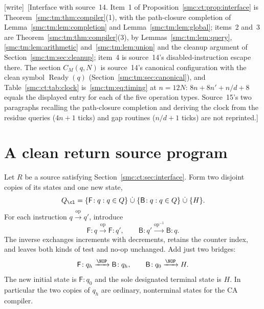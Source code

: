 \documentclass[11pt,letterpaper]{article}
\numberwithin{equation}{section}
\theoremstyle{definition}
\theoremstyle{remark}
\newcommand{\wtag}{\textup{[write]}}
\newcommand{\Ready}{\operatorname{Ready}}
\newcommand{\Fq}[1]{\mathsf F\!:#1}\newcommand{\Bq}[1]{\mathsf B\!:#1}
\begin{document}
\wtag\ [Interface with source~14. Item~1 of Proposition~\ref{smc:ct:prop:interface} is Theorem~\ref{smc:tm:thm:compiler}(1), with the path-closure completion of Lemma~\ref{smc:tm:lem:completion} and Lemma~\ref{smc:tm:lem:global}; items~2 and~3 are Theorem~\ref{smc:tm:thm:compiler}(3), by Lemmas~\ref{smc:tm:lem:query}, \ref{smc:tm:lem:arithmetic} and~\ref{smc:tm:lem:union} and the cleanup argument of Section~\ref{smc:tm:sec:cleanup}; item~4 is source~14's disabled-instruction escape there. The section $C_M(q,N)$ is source~14's canonical configuration with the clean symbol $\Ready(q)$ (Section~\ref{smc:tm:sec:canonical}), and Table~\ref{smc:ct:tab:clock} is~\eqref{smc:tm:eq:timing} at $n=12N$: $8n+8n'+n/d+8$ equals the displayed entry for each of the five operation types. Source~15's two paragraphs recalling the path-closure completion and deriving the clock from the residue queries ($4n+1$ ticks) and gap routines ($n/d+1$ ticks) are not reprinted.]

\section{A clean return source program}\label{smc:ct:sec:wrapper}

Let $R$ be a source satisfying Section~\ref{smc:ct:sec:interface}. Form two disjoint copies of its states and one new state,
\[
Q_{\cl}=\{\Fq q:q\in Q\}\;\dot\cup\;\{\Bq q:q\in Q\}\;\dot\cup\;\{H\}.
\]
For each instruction $q\xrightarrow{\mathrm{op}}q'$, introduce
\begin{equation}\label{smc:ct:eq:copies}
\Fq q\xrightarrow{\mathrm{op}}\Fq {q'},
\qquad
\Bq {q'}\xrightarrow{\mathrm{op}^{-1}}\Bq q.
\end{equation}
The inverse exchanges increments with decrements, retains the counter index, and leaves both kinds of test and no-op unchanged. Add just two bridges:
\begin{equation}\label{smc:ct:eq:bridges}
\Fq {q_h}\xrightarrow{\NOP}\Bq {q_h},
\qquad
\Bq {q_0}\xrightarrow{\NOP}H.
\end{equation}
The new initial state is $\Fq {q_0}$ and the sole designated terminal state is $H$. In particular the two copies of $q_h$ are ordinary, nonterminal states for the CA compiler.
\end{document}
